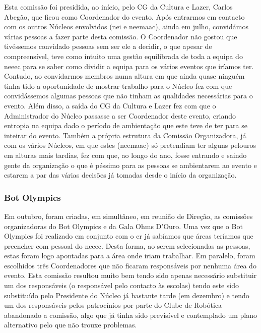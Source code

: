 Esta comissão foi presidida, ao início, pelo CG da Cultura e Lazer, Carlos Abegão, que ficou como Coordenador do evento. Após entrarmos em contacto com os outros Núcleos envolvidos (\acrshort{nei} e \acrshort{neemaac}), ainda em julho, convidámos várias pessoas a fazer parte desta comissão. O Coordenador não gostou que tivéssemos convidado pessoas sem ser ele a decidir, o que apesar de compreensível, teve como intuito uma gestão equilibrada de toda a equipa do \acrshort{neeec} para se saber como dividir a equipa para os vários eventos que iríamos ter. Contudo, ao convidarmos membros numa altura em que ainda quase ninguém tinha tido a oportunidade de mostrar trabalho para o Núcleo fez com que convidássemos algumas pessoas que não tinham as qualidades necessárias para o evento. Além disso, a saída do CG da Cultura e Lazer fez com que o Administrador do Núcleo passasse a ser Coordenador deste evento, criando entropia na equipa dado o período de ambientação que este teve de ter para se inteirar do evento. Também a própria estrutura da Comissão Organizadora, já com os vários Núcleos, em que estes (\acrshort{neemaac}) só pretendiam ter alguns pelouros em alturas mais tardias, fez com que, ao longo do ano, fosse entrando e saindo gente da organização o que é péssimo para as pessoas se ambientarem ao evento e estarem a par das várias decisões já tomadas desde o início da organização.

\subsubsection{Bot Olympics}

Em outubro, foram criadas, em simultâneo, em reunião de Direção, as comissões organizadoras do Bot Olympics e da Gala Ohms D'Ouro. Uma vez que o Bot Olympics foi realizado em conjunto com o \acrfull{cr} já sabíamos que áreas teríamos que preencher com pessoal do \acrshort{neeec}. Desta forma, ao serem selecionadas as pessoas, estas foram logo apontadas para a área onde iriam trabalhar. Em paralelo, foram escolhidos três Coordenadores que não ficaram responsáveis por nenhuma área do evento. Esta comissão resultou muito bem tendo sido apenas necessário substituir um dos responsáveis (o responsável pelo contacto às escolas) tendo este sido substituído pelo Presidente do Núcleo já bastante tarde (em dezembro) e tendo um dos responsáveis pelos patrocínios por parte do Clube de Robótica abandonado a comissão, algo que já tinha sido previsível e contemplado um plano alternativo pelo que não trouxe problemas.


